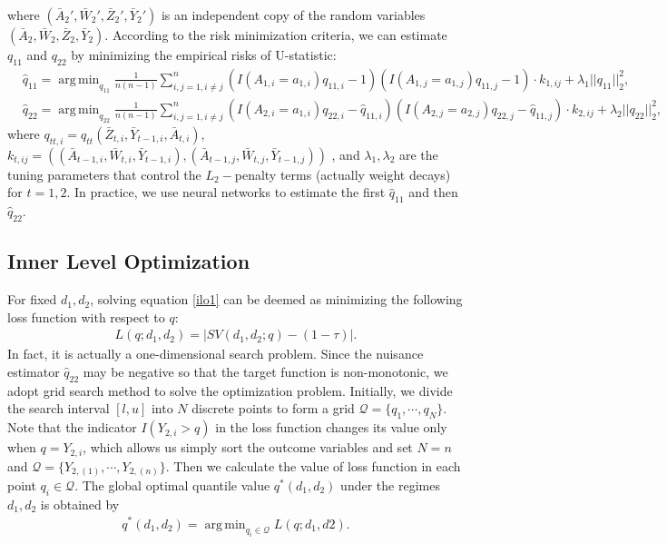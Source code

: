 \documentclass[10pt]{article}
\DeclareMathOperator*{\argmin}{arg\,min}
\theoremstyle{remark} \newtheorem{rem}{Remark}
\begin{document}
where $(\bar A_2', \bar W_2',\bar Z_2', \bar Y_2')$ is an independent copy of the random variables $(\bar A_2, \bar W_2,\bar Z_2, \bar Y_2)$.
According to the risk minimization criteria, we can estimate $q_{11}$ and $q_{22}$ by minimizing the empirical risks of U-statistic:
\begin{align}
    & \hat q_{11}=\argmin_{q_{11}} \frac{1}{n(n-1)}\sum_{i,j=1, i\neq j}^n (I(A_{1,i}=a_{1,i})q_{11,i}-1)(I(A_{1,j}=a_{1,j})q_{11,j}-1)\cdot k_{1,ij} + \lambda_1||q_{11}||_2^2, \label{q11hat}\\
    & \hat q_{22}=\argmin_{q_{22}} \frac{1}{n(n-1)}\sum_{i,j=1, i \neq j}^n (I(A_{2,i}=a_{1,i})q_{22,i}-\hat q_{11,i})(I(A_{2,j}=a_{2,j})q_{22,j}-\hat q_{11,j})\cdot k_{2,ij} + \lambda_2||q_{22}||_2^2, \label{q22hat}
\end{align}
where $q_{tt,i}=q_{tt}(\bar Z_{t,i}, \bar Y_{t-1,i}, \bar A_{t,i})$,  $k_{t,ij}=((\bar A_{t-1,i}, \bar W_{t,i},\bar Y_{t-1,i}),(\bar A_{t-1,j}, \bar W_{t,j},\bar Y_{t-1,j}))$ , and $\lambda_1, \lambda_2$ are the tuning parameters that control the $L_2-$penalty terms (actually weight decays) for $t=1,2$.
In practice, we use neural networks to estimate the first $\hat q_{11}$ and then $\hat q_{22}$.



\subsection{Inner Level Optimization}
For fixed $d_1,d_2$, solving equation \eqref{ilo1} can be deemed as minimizing the following loss function with respect to $q$:
\begin{align}
    L(q;d_1,d_2) = \Big| SV(d_1,d_2;q) - (1-\tau) \Big|.
\end{align}
In fact, it is actually a one-dimensional search problem.
Since the nuisance estimator $\hat q_{22}$ may be negative so that the target function is non-monotonic, we adopt grid search method to solve the optimization problem.
Initially, we divide the search interval $[l, u]$ into $N$ discrete points to form a grid
$\mathcal{Q} = \{q_1,\cdots,q_N\}$.
Note that the indicator $I(Y_{2,i}>q)$ in the loss function changes its value only when $q=Y_{2,i}$, which allows us simply sort the outcome variables and set $N=n$ and $\mathcal{Q} = \{Y_{2,(1)},\cdots,Y_{2,(n)}\}$.
Then we calculate the value of loss function in each point $q_i \in \mathcal{Q}$.
The global optimal quantile value $q^*(d_1,d_2)$ under the regimes $d_1,d_2$ is obtained by 
\begin{align}
    q^*(d_1,d_2) = \argmin_{q_i \in \mathcal{Q}} L(q;d_1,d2).
\end{align}
\end{document}
